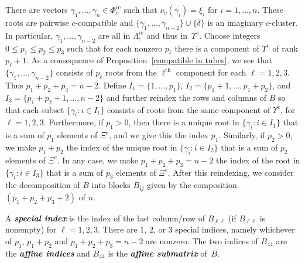 \documentclass{amsart}
\theoremstyle{definition}
\theoremstyle{remark}
\numberwithin{equation}{section}
\newcommand{\newword}[1]{\textbf{\emph{#1}}}
\newcommand{\set}[1]{{\lbrace #1 \rbrace}}
\renewcommand{\th}{^\text{th}}
\newcommand{\0}{{\mathbf{0}}}
\newcommand{\re}{\mathrm{re}}
\renewcommand{\th}{^\text{th}}
\newcommand{\RSChar}{\Phi}
\newcommand{\RS}{\RSChar}
\newcommand{\RSTChar}{\Upsilon}
\newcommand{\RST}[1]{\RSTChar^{#1}}
\newcommand{\SimplesTChar}{\Xi}
\newcommand{\SimplesT}[1]{\SimplesTChar^{#1}}
\newcommand{\AP}[1]{\RS_{#1}}
\newcommand{\APre}[1]{\AP{#1}^\re}
\newcommand{\APTChar}{\Lambda}
\newcommand{\APT}[1]{\APTChar_{#1}}
\newcommand{\APTre}[1]{\APT{#1}^\re}
\begin{document}
There are vectors $\gamma_1,\ldots,\gamma_n\in\APre{c}$ such that $\nu_c(\gamma_i)=\xi_i$ for $i=1,\ldots,n$.
These roots are pairwise $c$-compatible and $\set{\gamma_1,\ldots,\gamma_{n-2}}\cup\set{\delta}$ is an imaginary $c$-cluster.
In particular,  $\gamma_1,\ldots,\gamma_{n-2}$ are all in $\APTre{c}$ and thus in~$\RST{c}$.
Choose integers ${0\leq p_1\leq p_2 \leq p_3}$ such that for each nonzero $p_\ell$ there is a component of $\RST{c}$ of rank $p_\ell+1$.
As a consequence of Proposition~\ref{compatible in tubes}, we see that $\set{\gamma_1,\ldots,\gamma_{n-2}}$ consists of $p_\ell$ roots from the $\ell\th$ component for each $\ell=1,2,3$.
Thus ${p_1+p_2+p_3=n-2}$.
Define $I_1=\set{1,\ldots,p_1}$, $I_2=\set{p_1+1,\ldots,p_1+p_2}$, and $I_3=\set{p_1+p_2+1,\ldots,n-2}$ and further reindex the rows and columns of $B$ so that each subset $\set{\gamma_i:i\in I_\ell}$  consists of roots from the same component of $\RST{c}$, for $\ell=1,2,3$.
Furthermore, if $p_1>0$, then there is a unique root in $\set{\gamma_i:i\in I_1}$ that is a sum of $p_1$ elements of $\SimplesT{c}$, and we give this the index $p_1$.
Similarly, if $p_2>0$, we make $p_1+p_2$ the index of the unique root in $\set{\gamma_i:i\in I_2}$ that is a sum of $p_2$ elements of $\SimplesT{c}$.
In any case, we make $p_1+p_2+p_3=n-2$ the index of the root in $\set{\gamma_i:i\in I_3}$ that is a sum of $p_3$ elements of $\SimplesT{c}$.
After this reindexing, we consider the decomposition of $B$ into blocks $B_{ij}$ given by the composition $(p_1+p_2+p_3+2)$ of $n$.

A \newword{special index} is the index of the last column/row of $B_{\ell\ell}$ (if $B_{\ell\ell}$ is nonempty) for $\ell=1,2,3$.
There are $1$, $2$, or $3$ special indices, namely whichever of $p_1$, $p_1+p_2$ and $p_1+p_2+p_3=n-2$ are nonzero.
The two indices of $B_{44}$ are the \newword{affine indices} and $B_{44}$ is the \newword{affine submatrix} of~$B$.
\end{document}
